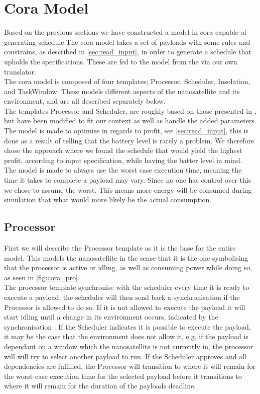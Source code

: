 \section{Cora Model} \label{sec:cora}
Based on the previous sections we have constructed a model in \gls{cora} capable of generating schedule.The \gls{cora} model takes a set of payloads with some rules and constrains, as described in \cref{sec:read_input}, in order to generate a schedule that upholds the specifications. These are fed to the model from the via our own translator.\\
The \gls{cora} model is composed of four templates; Processor, Scheduler, Insolation, and TaskWindow. These models different aspects of the nanosatellite and its environment, and are all described separately below.\\
The templates Processor and Scheduler, are roughly based on those presented in \cite{gomx3}, but have been modified to fit our context as well as handle the added parameters.\\
The model is made to optimise in regards to profit, see \cref{sec:read_input}, this is done as a result of  telling that the battery level is rarely a problem. We therefore chose the approach where we found the schedule that would yield the highest profit, according to input specification, while having the batter level in mind.\\
The model is made to always use the worst case execution time, meaning the time it takes to complete a payload may vary. Since no one has control over this we chose to assume the worst. This means more energy will be consumed during simulation that what would more likely be the actual consumption.

\subsection*{Processor}
First we will describe the Processor template as it is the base for the entire model. This models the nanosatellite in the sense that it is the one symbolising that the processor is active or idling, as well as consuming power while doing so, as seen in \cref{fig:cora_pro}. \\
The processor template synchronise with the scheduler every time it is ready to execute a payload, the scheduler will then send back a synchronisation if the Processor is allowed to do so. If it is not allowed to execute the payload it will start idling until a change in its environment occurs, indicated by the synchronisation . If the Scheduler indicates it is possible to execute the payload, it may be the case that the environment does not allow it, e.g. if the payload is dependant on a window which the nanosatellite is not currently in, the processor will will try to select another payload to run. If the Scheduler approves and all dependencies are fulfilled, the Processor will transition to  where it will remain for the worst case execution time for the selected payload before it transitions to  where it will remain for the duration of the payloads deadline.

